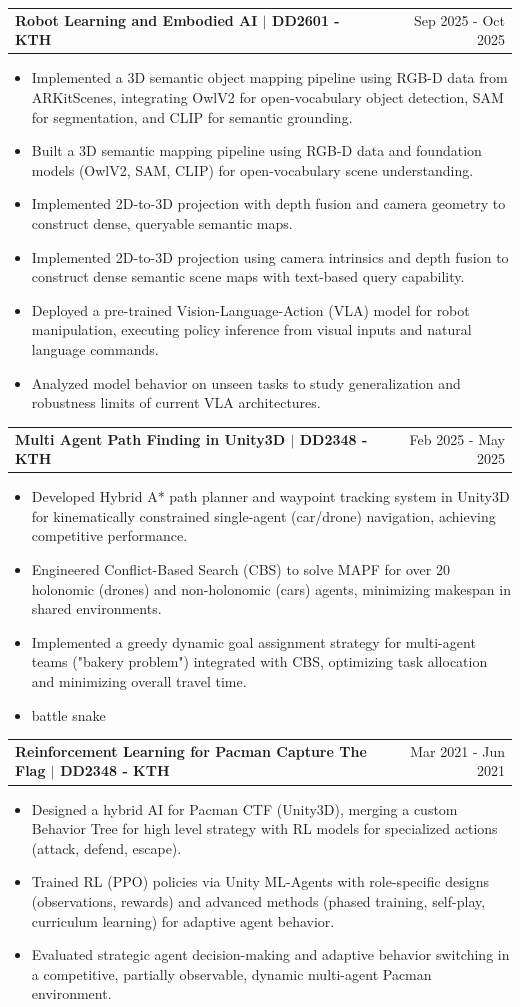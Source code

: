 \documentclass[letterpaper, 11pt]{article}
\makeatletter
\newcommand{\resumeItem}[1]{ \item\small{ {#1 \vspace{-2pt}} } }
\newcommand{\resumeProjectHeading}[2]{
\vspace{-1pt}
\item
\begin{tabular*}{1.0\textwidth}[t]{l@{\extracolsep{\fill}}r}
	\textbf{#1}  & {\small #2} \\
\end{tabular*}
\vspace{-20pt}
}
\newcommand{\resumeItemListStart}{\begin{itemize}[leftmargin=0.25in]}
\newcommand{\resumeItemListEnd}{\end{itemize}
\vspace{-5pt}}
\makeatother
\begin{document}
    \resumeProjectHeading{Robot Learning and Embodied AI $|$ \textnormal{\small DD2601 - KTH}}{Sep 2025 - Oct 2025}
    \resumeItemListStart 
        \resumeItem{Implemented a 3D semantic object mapping pipeline using RGB-D data from ARKitScenes, integrating OwlV2 for open-vocabulary object detection, SAM for segmentation, and CLIP for semantic grounding.}
        \resumeItem{Built a 3D semantic mapping pipeline using RGB-D data and foundation models (OwlV2, SAM, CLIP) for open-vocabulary scene understanding.}
        \resumeItem{Implemented 2D-to-3D projection with depth fusion and camera geometry to construct dense, queryable semantic maps.}
        \resumeItem{Implemented 2D-to-3D projection using camera intrinsics and depth fusion to construct dense semantic scene maps with text-based query capability.}
        \resumeItem{Deployed a pre-trained Vision-Language-Action (VLA) model for robot manipulation, executing policy inference from visual inputs and natural language commands.}

        \resumeItem{Analyzed model behavior on unseen tasks to study generalization and robustness limits of current VLA architectures.}
    \resumeItemListEnd

    
    \resumeProjectHeading{Multi Agent Path Finding in Unity3D $|$ \textnormal{\small DD2348 - KTH}}{Feb 2025 - May 2025}
    \resumeItemListStart 
        \resumeItem{Developed Hybrid A* path planner and waypoint tracking system in Unity3D for kinematically constrained single-agent (car/drone) navigation, achieving competitive performance.}
        \resumeItem{Engineered Conflict-Based Search (CBS) to solve MAPF for over 20 holonomic (drones) and non-holonomic (cars) agents, minimizing makespan in shared environments. }
        \resumeItem{Implemented a greedy dynamic goal assignment strategy for multi-agent teams ("bakery problem") integrated with CBS, optimizing task allocation and minimizing overall travel time. }
        \resumeItem{battle snake }
    \resumeItemListEnd

    \resumeProjectHeading{Reinforcement Learning for Pacman Capture The Flag $|$ \textnormal{\small DD2348 - KTH}}{Mar 2021 - Jun 2021}
    \resumeItemListStart 
        \resumeItem{Designed a hybrid AI for Pacman CTF (Unity3D), merging a custom Behavior Tree for high level strategy with RL models for specialized actions (attack, defend, escape).}
        \resumeItem{Trained RL (PPO) policies via Unity ML-Agents with role-specific designs (observations, rewards) and advanced methods (phased training, self-play, curriculum learning) for adaptive agent behavior.}
        \resumeItem{Evaluated strategic agent decision-making and adaptive behavior switching in a competitive, partially observable, dynamic multi-agent Pacman environment.}
    \resumeItemListEnd
\end{document}

